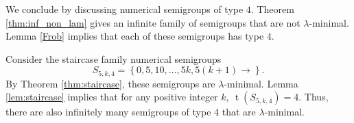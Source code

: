 \documentclass{amsproc}
\newcommand{\set}[1]{\left\{#1 \right\}}
\DeclareMathOperator{\type}{t}
\theoremstyle{definition}
\theoremstyle{remark}
\numberwithin{equation}{section}
\begin{document}
We conclude by discussing numerical semigroups of type $4$. Theorem \ref{thm:inf_non_lam} gives an infinite family of semigroups that are not $\lambda$-minimal.  Lemma \ref{Frob} implies that each of these semigroups has type $4$. 

Consider the staircase family numerical semigroups 
    \[
    S_{5, k, 4}=\set{0,5,10, ..., 5k, 5(k+1) \rightarrow}.
    \]
    By Theorem \ref{thm:staircase}, these semigroups are $\lambda$-minimal. Lemma \ref{lem:staircase} implies that for any positive integer $k,\ \type(S_{5, k, 4})=4$.
Thus, there are also infinitely many semigroups of type $4$ that are $\lambda$-minimal.


\nocite{*}

\end{document}
